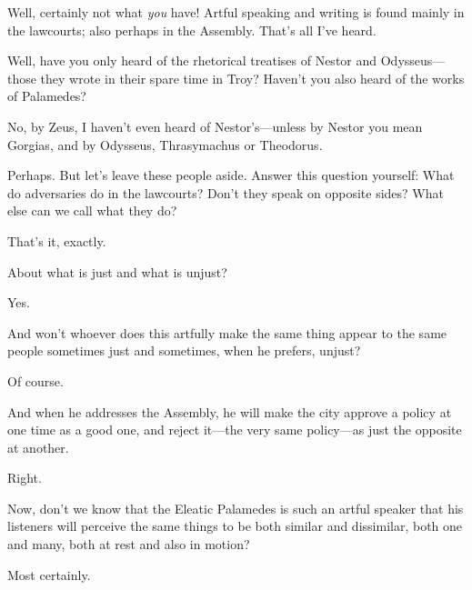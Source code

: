 \sayphaedrus Well, certainly not what {\em you} have! Artful speaking and
writing is found mainly in the lawcourts; also perhaps in the Assembly.
That’s all I’ve heard.

\saysocrates Well, have you only heard of the rhetorical treatises of
Nestor and Odysseus---those they wrote in their spare time in Troy?
Haven’t you also heard of the works of
Palamedes?

\sayphaedrus No, by Zeus, I haven’t even heard of Nestor’s---unless
by Nestor you mean Gorgias, and by Odysseus, Thrasymachus or
Theodorus.

\saysocrates Perhaps. But let’s leave these people aside. Answer this
question yourself: What do adversaries do in the lawcourts? Don’t they
speak on opposite sides? What else can we call what they do?

\sayphaedrus That’s it, exactly.

\saysocrates About what is just and what is unjust?

\sayphaedrus Yes.

\saysocrates And won’t whoever does this artfully make the same
thing appear to the same people sometimes just and sometimes, when he
prefers, unjust?

\sayphaedrus Of course.

\saysocrates And when he addresses the Assembly, he will make the city
approve a policy at one time as a good one, and reject it---the very
same policy---as just the opposite at another.

\sayphaedrus Right.

\saysocrates Now, don’t we know that the Eleatic Palamedes is such an
artful speaker that his listeners will perceive the same things to be
both similar and dissimilar, both one and many, both at rest and also in
motion?

\sayphaedrus Most certainly.

